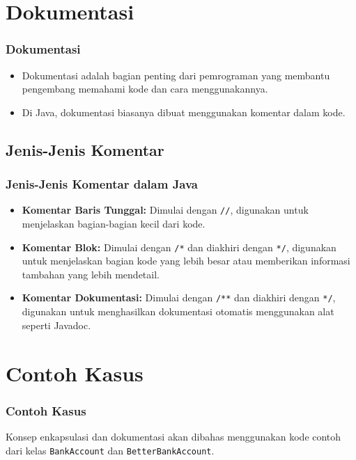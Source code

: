 \documentclass[aspectratio=169, table]{beamer}
\begin{document}
\section{Dokumentasi}

\begin{frame}
\frametitle{Dokumentasi}
\begin{itemize}
	\item Dokumentasi adalah bagian penting dari pemrograman yang membantu pengembang memahami kode dan cara menggunakannya.
	\item Di Java, dokumentasi biasanya dibuat menggunakan komentar dalam kode.
\end{itemize}
\end{frame}

\subsection{Jenis-Jenis Komentar}

\begin{frame}
\frametitle{Jenis-Jenis Komentar dalam Java}
\begin{itemize}
	\item \textbf{Komentar Baris Tunggal:} Dimulai dengan \texttt{//}, digunakan untuk menjelaskan bagian-bagian kecil dari kode.
	\item \textbf{Komentar Blok:} Dimulai dengan \texttt{/*} dan diakhiri dengan \texttt{*/}, digunakan untuk menjelaskan bagian kode yang lebih besar atau memberikan informasi tambahan yang lebih mendetail.
	\item \textbf{Komentar Dokumentasi:} Dimulai dengan \texttt{/**} dan diakhiri dengan \texttt{*/}, digunakan untuk menghasilkan dokumentasi otomatis menggunakan alat seperti Javadoc.
\end{itemize}
\end{frame}

\section{Contoh Kasus}

\begin{frame}
\frametitle{Contoh Kasus}
Konsep enkapsulasi dan dokumentasi akan dibahas menggunakan kode contoh dari kelas \texttt{BankAccount} dan \texttt{BetterBankAccount}.
\end{frame}

\end{document}
